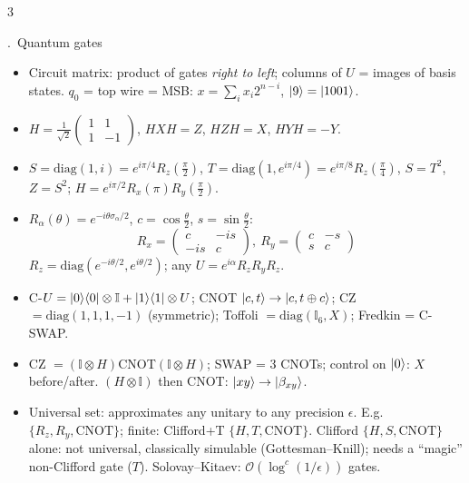 \documentclass[8pt,a4paper]{extarticle}
\newcounter{sec}\newcounter{ssec}[sec]
\newcommand{\sect}[1]{\stepcounter{sec}\par\vspace{2pt}\noindent\colorbox{hd}{\parbox{\dimexpr\linewidth-2\fboxsep}{\color{white}\bfseries\strut\arabic{sec}.\ #1}}\par\vspace{0.5pt}}
\newcommand{\id}{\mathbb{I}}
\newcommand{\pr}[1]{\ket{#1}\!\bra{#1}}
\begin{document}
\begin{multicols}{3}
\sect{Quantum gates}
\begin{itemize}
\item Circuit matrix: product of gates \emph{right to left}; columns of $U$ = images of basis states. $q_0$ = top wire = MSB: $x=\sum_ix_i2^{n-i}$, $\ket9=\ket{1001}$.
\item $H=\frac1{\sqrt2}\begin{pmatrix}1&1\\1&-1\end{pmatrix}$, $HXH=Z$, $HZH=X$, $HYH=-Y$.
\item $S=\mathrm{diag}(1,i)=e^{i\pi/4}R_z(\frac\pi2)$, $T=\mathrm{diag}(1,e^{i\pi/4})=e^{i\pi/8}R_z(\frac\pi4)$, $S=T^2$, $Z=S^2$; $H=e^{i\pi/2}R_x(\pi)R_y(\frac\pi2)$.
\item $R_\alpha(\theta)=e^{-i\theta\sigma_\alpha/2}$, $c=\cos\frac\theta2$, $s=\sin\frac\theta2$:
\[R_x=\begin{pmatrix}c&-is\\-is&c\end{pmatrix},\ R_y=\begin{pmatrix}c&-s\\s&c\end{pmatrix}\]
$R_z=\mathrm{diag}(e^{-i\theta/2},e^{i\theta/2})$; any $U=e^{i\alpha}R_z R_y R_z$.
\item C-$U=\pr0\otimes\id+\pr1\otimes U$; CNOT $\ket{c,t}\to\ket{c,t\oplus c}$; CZ $=\mathrm{diag}(1,1,1,-1)$ (symmetric); Toffoli $=\mathrm{diag}(\id_6,X)$; Fredkin = C-SWAP.
\item CZ $=(\id\otimes H)$CNOT$(\id\otimes H)$; SWAP = 3 CNOTs; control on $\ket0$: $X$ before/after. $(H\otimes\id)$ then CNOT: $\ket{xy}\to\ket{\beta_{xy}}$.
\item Universal set: approximates any unitary to any precision $\epsilon$. E.g.\ $\{R_z,R_y,\text{CNOT}\}$; finite: Clifford+T $\{H,T,\text{CNOT}\}$. Clifford $\{H,S,\text{CNOT}\}$ alone: not universal, classically simulable (Gottesman--Knill); needs a ``magic'' non-Clifford gate ($T$). Solovay--Kitaev: $\mathcal O(\log^c(1/\epsilon))$ gates.
\end{itemize}


\end{multicols}
\end{document}
